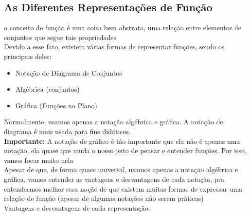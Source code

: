 \documentclass{article}
\begin{document}
\subsection{As Diferentes Representações de Função}
o conceito de função é uma coisa bem abstrata, uma relação entre elementos de conjuntos que segue tais propriedades
\\[2pt]
Devido a esse fato, existem várias formas de representar funções, sendo os principais deles:
\begin{itemize}
    \item Notação de Diagrama de Conjuntos

    \item Algébrica (conjuntos)

    \item Gráfica (Funções no Plano)
\end{itemize}
Normalmente, usamos apenas a notação algébrica e gráfica. A notação de diagrama é mais usada para fins didáticos.
\\[5pt]
\textbf{Importante:} A notação de gráfico é tão importante que ela não é apenas uma notação, ela quase que muda o nosso jeito de pensar e entender funções. Por isso, vamos focar muito nela
\\[5pt]
Apesar de que, de forma quase universal, usamos apenas a notação algébrica e gráfica, vamos entender as vantagens e desvantagens de cada notação, pra entendermos melhor essa noção de que existem muitas formas de expressar uma relação de função (apesar de algumas notações não serem práticas)
\\[5pt]
Vantagens e desvantagens de cada representação:
\end{document}
